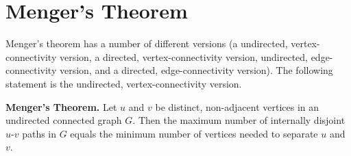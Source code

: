 \section{Menger's Theorem}

Menger's theorem has a number of different versions
(a undirected, vertex-connectivity version,
a directed, vertex-connectivity version,
undirected, edge-connectivity version, and 
a directed, edge-connectivity version). The following statement 
is the undirected, vertex-connectivity version.

\begin{theorem}
\textbf{Menger's Theorem.}
Let $u$ and $v$ be distinct, non-adjacent vertices in an undirected
connected graph
$G$. Then the maximum number of internally disjoint $u$-$v$ paths in
$G$ equals the minimum number of vertices needed to separate $u$ and $v$.
\end{theorem}

